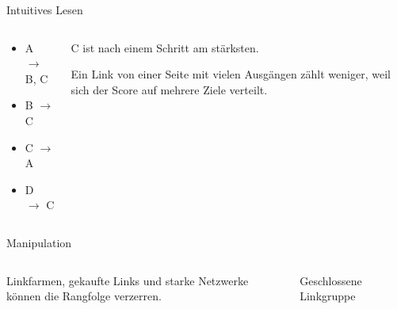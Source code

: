 \begin{frame}{Intuitives Lesen}
    \begin{columns}
        \begin{myexercise}
            \begin{itemize}
                \item A \(\to\) B, C
                \item B \(\to\) C
                \item C \(\to\) A
                \item D \(\to\) C
            \end{itemize}
        \end{myexercise}
        \begin{myanswer}
            C ist nach einem Schritt am stärksten.

            Ein Link von einer Seite mit vielen Ausgängen zählt weniger, weil sich der Score auf mehrere Ziele verteilt.
        \end{myanswer}
    \end{columns}
\end{frame}

\begin{frame}{Manipulation}
    \begin{columns}
        \begin{mycaution}
            Linkfarmen, gekaufte Links und starke Netzwerke können die Rangfolge verzerren.
        \end{mycaution}
        \begin{figure}[H]
            \centering
            \caption*{Geschlossene Linkgruppe}
        \end{figure}
    \end{columns}
\end{frame}

